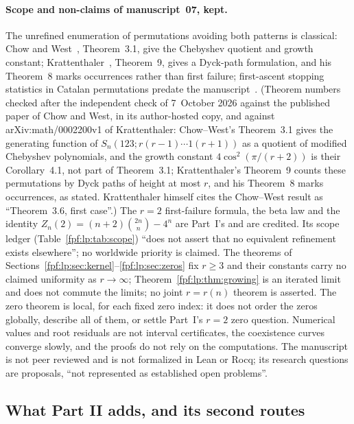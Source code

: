 \documentclass[11pt]{article}
\numberwithin{equation}{section}
\theoremstyle{definition}
\begin{document}
\paragraph{Scope and non-claims of manuscript~07, kept.}
The unrefined enumeration of permutations avoiding both patterns is
classical: Chow and West~\cite{fpf-lp-cw}, Theorem~3.1, give the Chebyshev
quotient and growth constant; Krattenthaler~\cite{fpf-lp-kratt},
Theorem~9, gives a Dyck-path formulation, and his Theorem~8 marks
occurrences rather than first failure; first-ascent stopping statistics in
Catalan permutations predate the manuscript~\cite{fpf-lp-firstascent}.
\textup{(Theorem numbers checked after the independent check of
7~October 2026 against the published paper of Chow and West, in its
author-hosted copy, and against arXiv:math/0002200v1 of Krattenthaler:
Chow--West's Theorem~3.1 gives the generating function of
$S_n(123;r(r-1)\cdots1(r+1))$ as a quotient of modified Chebyshev
polynomials, and the growth constant $4\cos^2(\pi/(r+2))$ is their
Corollary~4.1, not part of Theorem~3.1; Krattenthaler's Theorem~9 counts
these permutations by Dyck paths of height at most $r$, and his Theorem~8
marks occurrences, as stated. Krattenthaler himself cites the Chow--West
result as ``Theorem~3.6, first case''.)} The
$r=2$ first-failure formula, the beta law and the identity
$Z_n(2)=(n+2)\binom{2n}n-4^n$ are Part~I's and are credited. Its scope
ledger (Table~\ref{fpf:lp:tab:scope}) ``does not assert that no equivalent
refinement exists elsewhere''; no worldwide priority is claimed. The
theorems of Sections~\ref{fpf:lp:sec:kernel}--\ref{fpf:lp:sec:zeros} fix
$r\ge3$ and their constants carry no claimed uniformity as $r\to\infty$;
Theorem~\ref{fpf:lp:thm:growing} is an iterated limit and does not commute
the limits; no joint $r=r(n)$ theorem is asserted. The zero theorem is
local, for each fixed zero index: it does not order the zeros globally,
describe all of them, or settle Part~I's $r=2$ zero question. Numerical
values and root residuals are not interval certificates, the coexistence
curves converge slowly, and the proofs do not rely on the computations. The
manuscript is not peer reviewed and is not formalized in Lean or Rocq; its
research questions are proposals, ``not represented as established open
problems''.

\subsection{What Part II adds, and its second routes}\label{fpf:lp:sec:claims}
\end{document}
